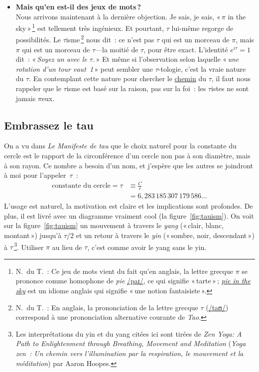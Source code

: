 \begin{itemize}
  \item \textbf{Mais qu'en est-il des jeux de mots\,?} \\ Nous arrivons maintenant à la dernière objection. Je sais, je sais, «\,$\pi$ in the sky\,»\,\footnote{N.\ du T.~: Ce jeu de mots vient du fait qu'en anglais, la lettre grecque $\pi$ se prononce comme homophone de \emph{pie} \href{https://fr.wikipedia.org/wiki/Alphabet_phonétique_international}{/paɪ/}, ce qui signifie «\,tarte\,»\,; \href{https://en.wiktionary.org/wiki/pie_in_the_sky}{\emph{pie in the sky}} est un idiome anglais qui signifie «\,une notion fantaisiste\,».} est tellement très ingénieux. Et pourtant, $\tau$ lui-même regorge de possibilités. Le $\tau$isme\,\footnote{N.\ du T.~: En anglais, la prononciation de la lettre grecque $\tau$ (\href{https://en.wiktionary.org/wiki/pie_in_the_sky}{/taʊ/}) correspond à une prononciation alternative courante de \emph{Tao}.} nous dit~: ce n'est pas $\tau$ qui est un morceau de $\pi$, mais $\pi$ qui est un morceau de $\tau$---la moitié de $\tau$, pour être exact. L'identité $e^{i\tau} = 1$ dit~: «\,\emph{Soyez un avec le $\tau$.}\,» Et même si l'observation selon laquelle «\,\emph{une rotation d'un tour vaut~1}\,» peut sembler une $\tau$-tologie, c'est la vraie nature du $\tau$. En contemplant cette nature pour chercher le \href{https://fr.wikipedia.org/wiki/Tao_(culture)}{chemin} du $\tau$, il faut nous rappeler que le $\tau$isme est basé sur la raison, pas sur la foi~: les $\tau$istes ne sont jamais $\pi$eux.

\end{itemize}


  \subsection{Embrassez le tau} %
  \label{sec:embrace_the_tau}

On a vu dans \emph{Le Manifeste de tau} que le choix naturel pour la constante du cercle est le rapport de la circonférence d'un cercle non pas à son diamètre, mais à son rayon. Ce nombre a besoin d'un nom, et j'espère que les autres se joindront à moi pour l'appeler~$\tau$~:
\[
\begin{split}
\mbox{constante du cercle} = \tau & \equiv \frac{C}{r} \\
                                  & = 6{,}283\,185\,307\,179\,586\ldots
\end{split}
\]
L'usage est naturel, la motivation est claire et les implications sont profondes. De plus, il est livré avec un diagramme vraiment cool (la figure~\ref{fig:tauism}). On voit sur la figure~\ref{fig:tauism} un mouvement à travers le \emph{yang} («\,clair, blanc, montant\,») jusqu'à $\tau/2$ et un retour à travers le \emph{yin} («\,sombre, noir, descendant\,») à $\tau$\,\footnote{Les interprétations du yin et du yang citées ici sont tirées de \emph{Zen Yoga: A Path to Enlightenment through Breathing, Movement and Meditation} (\emph{Yoga zen~: Un chemin vers l'illumination par la respiration, le mouvement et la méditation}) par Aaron Hoopes.}. Utiliser $\pi$ au lieu de $\tau$, c'est comme avoir le yang sans le yin.

